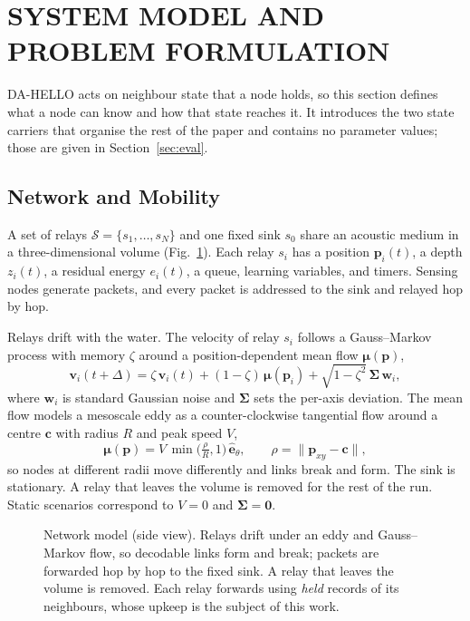 \section{SYSTEM MODEL AND PROBLEM FORMULATION}
\label{sec:prelim}
DA-HELLO acts on neighbour state that a node holds, so this section defines what a node can know and how that state reaches it. It introduces the two state carriers that organise the rest of the paper and contains no parameter values; those are given in Section~\ref{sec:eval}.

\subsection{Network and Mobility}
\label{sec:network}
A set of relays $\mathcal{S}=\{s_1,\dots,s_N\}$ and one fixed sink $s_0$ share an acoustic medium in a three-dimensional volume (Fig.~\ref{fig:network}). Each relay $s_i$ has a position $\mathbf{p}_i(t)$, a depth $z_i(t)$, a residual energy $e_i(t)$, a queue, learning variables, and timers. Sensing nodes generate packets, and every packet is addressed to the sink and relayed hop by hop.

Relays drift with the water. The velocity of relay $s_i$ follows a Gauss--Markov process with memory $\zeta$ around a position-dependent mean flow $\boldsymbol{\mu}(\mathbf{p})$,
\begin{equation}
\mathbf{v}_i(t{+}\Delta)=\zeta\,\mathbf{v}_i(t)+(1-\zeta)\,\boldsymbol{\mu}(\mathbf{p}_i)+\sqrt{1-\zeta^2}\,\boldsymbol{\Sigma}\,\mathbf{w}_i,
\label{eq:gm}
\end{equation}
where $\mathbf{w}_i$ is standard Gaussian noise and $\boldsymbol{\Sigma}$ sets the per-axis deviation. The mean flow models a mesoscale eddy as a counter-clockwise tangential flow around a centre $\mathbf{c}$ with radius $R$ and peak speed $V$,
\begin{equation}
\boldsymbol{\mu}(\mathbf{p})=V\,\min\!\Big(\tfrac{\rho}{R},1\Big)\,\hat{\mathbf{e}}_\theta,\qquad \rho=\|\mathbf{p}_{xy}-\mathbf{c}\|,
\label{eq:eddy}
\end{equation}
so nodes at different radii move differently and links break and form. The sink is stationary. A relay that leaves the volume is removed for the rest of the run. Static scenarios correspond to $V=0$ and $\boldsymbol{\Sigma}=\mathbf{0}$.

\begin{figure}[t]
\centering

\caption{Network model (side view). Relays drift under an eddy and Gauss--Markov flow, so decodable links form and break; packets are forwarded hop by hop to the fixed sink. A relay that leaves the volume is removed. Each relay forwards using \emph{held} records of its neighbours, whose upkeep is the subject of this work.}
\label{fig:network}
\end{figure}

